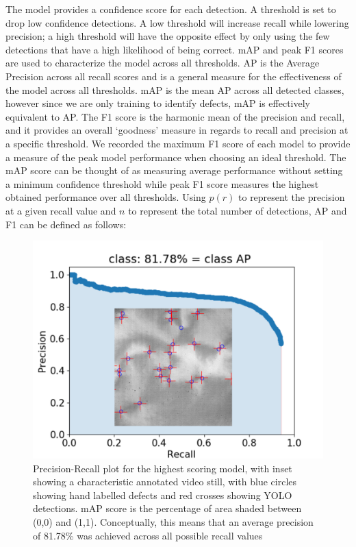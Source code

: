 \documentclass[twoside,twocolumn,9pt]{article}
\begin{document}
The model provides a confidence score for each detection. A threshold is set to drop low confidence detections. A low threshold will increase recall while lowering precision; a high threshold will have the opposite effect by only using the few detections that have a high likelihood of being correct. mAP and peak F1 scores are used to characterize the model across all thresholds. AP is the Average Precision across all recall scores and is a general measure for the effectiveness of the model across all thresholds. mAP is the mean AP across all detected classes, however since we are only training to identify defects, mAP is effectively equivalent to AP. The F1 score is the harmonic mean of the precision and recall, and it provides an overall `goodness' measure in regards to recall and precision at a specific threshold. We recorded the maximum F1 score of each model to provide a measure of the peak model performance when choosing an ideal threshold. The mAP\cite{everingham_pascal_2010} score can be thought of as measuring average performance without setting a minimum confidence threshold while peak F1\cite{chinchor_muc-4_1992} score measures the highest obtained performance over all thresholds. Using $p(r)$ to represent the precision at a given recall value and $n$ to represent the total number of detections, AP and F1 can be defined as follows:

\begin{figure}
  \includegraphics[width=\linewidth]{recal.png}
  \caption{Precision-Recall plot for the highest scoring model, with inset showing a characteristic annotated video still, with blue circles showing hand labelled defects and red crosses showing YOLO detections. mAP score is the percentage of area shaded between (0,0) and (1,1). Conceptually, this means that an average precision of 81.78\% was achieved across all possible recall values}
  \label{fig:mAP score}
\end{figure}
\end{document}
